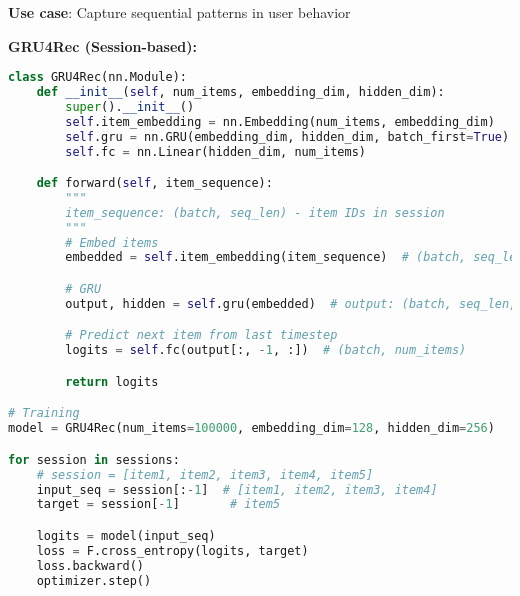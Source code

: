 \documentclass[10pt]{article}
\begin{document}
\textbf{Use case}: Capture sequential patterns in user behavior

\textbf{GRU4Rec (Session-based):}
\begin{lstlisting}[language=Python]
class GRU4Rec(nn.Module):
    def __init__(self, num_items, embedding_dim, hidden_dim):
        super().__init__()
        self.item_embedding = nn.Embedding(num_items, embedding_dim)
        self.gru = nn.GRU(embedding_dim, hidden_dim, batch_first=True)
        self.fc = nn.Linear(hidden_dim, num_items)

    def forward(self, item_sequence):
        """
        item_sequence: (batch, seq_len) - item IDs in session
        """
        # Embed items
        embedded = self.item_embedding(item_sequence)  # (batch, seq_len, emb_dim)

        # GRU
        output, hidden = self.gru(embedded)  # output: (batch, seq_len, hidden_dim)

        # Predict next item from last timestep
        logits = self.fc(output[:, -1, :])  # (batch, num_items)

        return logits

# Training
model = GRU4Rec(num_items=100000, embedding_dim=128, hidden_dim=256)

for session in sessions:
    # session = [item1, item2, item3, item4, item5]
    input_seq = session[:-1]  # [item1, item2, item3, item4]
    target = session[-1]       # item5

    logits = model(input_seq)
    loss = F.cross_entropy(logits, target)
    loss.backward()
    optimizer.step()
\end{lstlisting}
\end{document}
